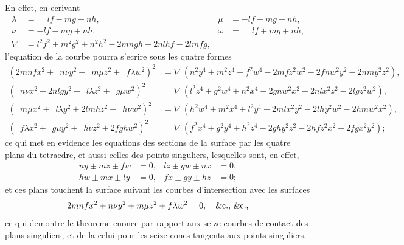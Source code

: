 \documentclass[11pt,a4paper]{book}
\begin{document}
En effet, en ecrivant
\begin{align*}
\lambda &= \phantom{-}lf - mg - nh, & \mu &= -lf + mg - nh, \\
\nu &= -lf - mg + nh, & \omega &= \phantom{-}lf + mg + nh, \\
\nabla &= l^2f^2 + m^2g^2 + n^2h^2 - 2mngh - 2nlhf - 2lmfg,
\end{align*}
l'equation de la courbe pourra s'ecrire sous les quatre formes
{\footnotesize
\begin{align*}
(2mnfx^2 + \phantom{2}n\nu y^2 + \phantom{2}m\mu z^2 + \phantom{2}f\lambda w^2)^2 &= \nabla\,(n^2y^4 + m^2z^4 + f^2w^4 - 2mfz^2w^2 - 2fnw^2y^2 - 2nmy^2z^2), \\
(\phantom{2}n\nu x^2 + 2nlgy^2 + \phantom{2}l\lambda z^2 + \phantom{2}g\mu w^2)^2 &= \nabla\,(l^2z^4 + g^2w^4 + n^2x^4 - 2gnw^2x^2 - 2nlx^2z^2 - 2lgz^2w^2), \\
(\phantom{2}m\mu x^2 + \phantom{2}l\lambda y^2 + 2lmhz^2 + \phantom{2}h\nu w^2)^2 &= \nabla\,(h^2w^4 + m^2x^4 + l^2y^4 - 2mlx^2y^2 - 2lhy^2w^2 - 2hmw^2x^2), \\
(\phantom{2}f\lambda x^2 + \phantom{2}g\mu y^2 + \phantom{2}h\nu z^2 + 2fghw^2)^2 &= \nabla\,(f^2x^4 + g^2y^4 + h^2z^4 - 2ghy^2z^2 - 2hfz^2x^2 - 2fgx^2y^2);
\end{align*}
}
ce qui met en evidence les equations des sections de la surface par les quatre plans du tetraedre, et aussi celles des points singuliers, lesquelles sont, en effet,
\begin{align*}
ny \pm mz \pm fw &= 0, & lz \pm gw \pm nx &= 0, \\
hw \pm mx \pm ly &= 0, & fx \pm gy \pm hz &= 0;
\end{align*}
et ces plans touchent la surface suivant les courbes d'intersection avec les surfaces
\[
2mnfx^2 + n\nu y^2 + m\mu z^2 + f\lambda w^2 = 0, \quad \&\text{c., \&\text{c.},}
\]
ce qui demontre le theoreme enonce par rapport aux seize courbes de contact des plans singuliers, et de la celui pour les seize cones tangents aux points singuliers.
\end{document}

